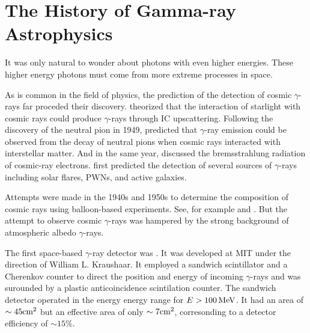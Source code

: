 
\section{The History of Gamma-ray Astrophysics}

It was only natural to wonder about photons with even
higher energies. These higher energy photons must
come from more extreme processes in space.

As is common in the field of physics, the prediction of
the detection of cosmic $\gamma$-rays far proceded their discovery.
\cite{feenberg_1948_interaction-cosmic-ray} theorized that the interaction
of starlight with cosmic rays could produce $\gamma$-rays through
\ac{IC} upscattering.  Following the discovery of the neutral
pion in 1949, \cite{hayakawa_1952_propagation-cosmic}
predicted that $\gamma$-ray emission could be observed from the
decay of neutral pions when cosmic rays interacted with interstellar
matter.  And in the same year, \cite{hutchinson_1952_possible-relation}
discussed the bremsstrahlung radiation of cosmic-ray electrons.
\cite{morrison_1958_gamma-ray-astronomy} first predicted the detection
of several sources of $\gamma$-rays including solar flares, \acp{PWN},
and active galaxies.

Attempts were made in the 1940s and 1950s to determine the
composition of cosmic rays using balloon-based experiments. See,
for example \cite{critchfield_1952_radiation-balloon} and
\cite{hulsizer_1948_search-electrons}.  But the attempt to observe
cosmic $\gamma$-rays was hampered by the strong background of atmospheric
albedo $\gamma$-rays.



The first space-based $\gamma$-ray detector was \explorerxi
\cite{kraushaar_1965_explorer-experiment}.  It was developed at \ac{MIT}
under the direction of William L. Kraushaar.  It employed a sandwich
scintillator and a Cherenkov counter to direct the position and energy
of incoming $\gamma$-rays and was surounded by a plastic anticoincidence
scintilation counter. The sandwich detector operated in the energy
energy range for $E>100\,\text{MeV}$.
It had an area of $\sim45\text{cm}^2$
but an effective area of only $\sim 7\text{cm}^2$, corresonding
to a detector efficiency of $\sim 15\%$.

